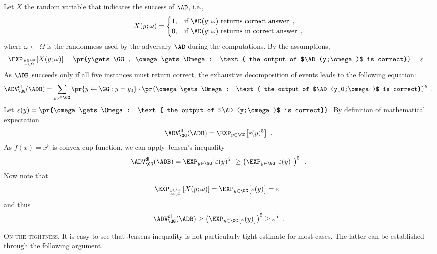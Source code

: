 \documentclass{crypto-exercise}
\begin{document}
\begin{solution} 
Let $X$ the random variable that indicates the success of $\AD$, i.e., 
\begin{align*}
X(y;\omega)=
\begin{cases}
1, &\text {if } \AD(y;\omega) \text{ returns correct answer}\enspace,\\
0, &\text {if } \AD(y;\omega) \text{ returns in correct answer}\enspace,
\end{cases}
\end{align*}
where $\omega\gets\Omega$ is the randomness used by the adversary $\AD$ during the computations. By the assumptions,    
\begin{align*}
\EXP_{y\in\GG\atop \omega\in\Omega} [X(y;\omega)]=\pr{y\gets \GG, \omega\gets\Omega: \text{ the output of $\AD(y;\omega)$ is correct}}=\varepsilon\enspace.
\end{align*}
As $\ADB$ succeeds only if all five instances must return correct, the exhaustive decomposition of events leads to the following equation:
\begin{align*}
\ADVDL{\GG}{\ADB}=\sum_{y_0\in\GG}\pr{y\gets\GG:y=y_0}\cdot \pr{\omega\gets\Omega: \text{ the output of $\AD(y_0;\omega)$ is correct}}^5\enspace.
\end{align*}
Let $\varepsilon(y)=\pr{\omega\gets\Omega: \text{ the output of $\AD(y;\omega)$ is correct}}$. By definition of mathematical expectation
\begin{align*}
\ADVDL{\GG}{\ADB}=\EXP_{y\in\GG} \bigl[\varepsilon(y)^5\bigr]\enspace.
\end{align*}
As $f(x)=x^5$ is convex-cup function, we can apply Jensen's inequality
\begin{align*}
\ADVDL{\GG}{\ADB}=\EXP_{y\in\GG} \bigl[\varepsilon(y)^5\bigr]\geq \left( \EXP_{y\in\GG} \bigl[\varepsilon(y)\bigr]\right)^5\enspace.
\end{align*}
Now note that 
\begin{align*}
\EXP_{y\in\GG\atop \omega\in\Omega} [X(y;\omega)]=\EXP_{y\in\GG} \bigl[\varepsilon(y)\bigr]=\varepsilon\enspace
\end{align*}
and thus
\begin{align*}
\ADVDL{\GG}{\ADB}\geq \left( \EXP_{y\in\GG} \bigl[\varepsilon(y)\bigr]\right)^5\geq \varepsilon^5\enspace.
\end{align*}

\noindent\textsc{On the tightness.}
It is easy to see that Jensens inequality is not particularly tight estimate for most cases. The latter can be established through the following argument. 


\end{solution}
\end{document}
